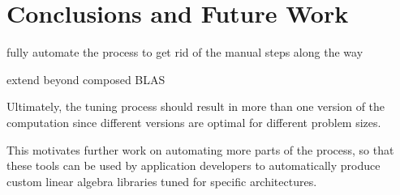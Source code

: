 \documentclass[11pt]{article}
\begin{document}



\section{Conclusions and Future Work}

fully automate the process to get rid of the manual steps along the way

extend beyond composed BLAS

Ultimately, the tuning process should result in more than one version of the computation since different versions are optimal for different problem sizes.

This motivates further work on automating more parts of the process, so that these tools can be used by application developers to automatically produce custom linear algebra libraries tuned for specific architectures.

\singlespacing


\end{document}
